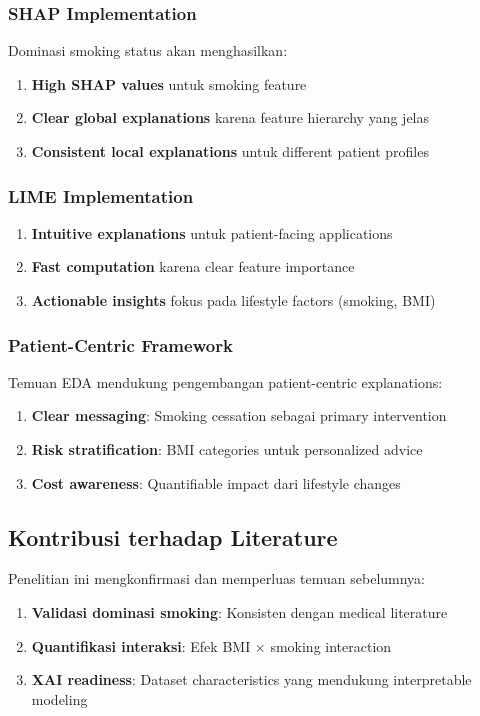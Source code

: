 \subsubsection{SHAP Implementation}
Dominasi smoking status akan menghasilkan:
\begin{enumerate}
    \item \textbf{High SHAP values} untuk smoking feature
    \item \textbf{Clear global explanations} karena feature hierarchy yang jelas
    \item \textbf{Consistent local explanations} untuk different patient profiles
\end{enumerate}

\subsubsection{LIME Implementation}
\begin{enumerate}
    \item \textbf{Intuitive explanations} untuk patient-facing applications
    \item \textbf{Fast computation} karena clear feature importance
    \item \textbf{Actionable insights} fokus pada lifestyle factors (smoking, BMI)
\end{enumerate}

\subsubsection{Patient-Centric Framework}
Temuan EDA mendukung pengembangan patient-centric explanations:
\begin{enumerate}
    \item \textbf{Clear messaging}: Smoking cessation sebagai primary intervention
    \item \textbf{Risk stratification}: BMI categories untuk personalized advice
    \item \textbf{Cost awareness}: Quantifiable impact dari lifestyle changes
\end{enumerate}

\subsection{Kontribusi terhadap Literature}
\label{subsec:kontribusi-literature}

Penelitian ini mengkonfirmasi dan memperluas temuan sebelumnya:
\begin{enumerate}
    \item \textbf{Validasi dominasi smoking}: Konsisten dengan medical literature
    \item \textbf{Quantifikasi interaksi}: Efek BMI × smoking interaction
    \item \textbf{XAI readiness}: Dataset characteristics yang mendukung interpretable modeling
\end{enumerate}

